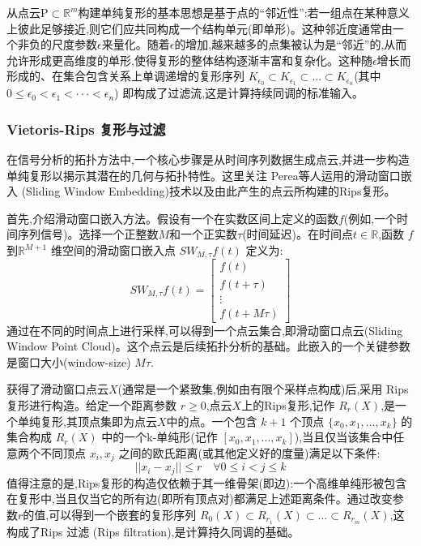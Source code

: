 从点云P$\subset \mathbb{R}^m$构建单纯复形的基本思想是基于点的“邻近性”:若一组点在某种意义上彼此足够接近,则它们应共同构成一个结构单元(即单形)。这种邻近度通常由一个非负的尺度参数$\epsilon$来量化。随着$\epsilon$的增加,越来越多的点集被认为是“邻近”的,从而允许形成更高维度的单形,使得复形的整体结构逐渐丰富和复杂化。这种随$\epsilon$增长而形成的、在集合包含关系上单调递增的复形序列 $K_{\epsilon_{0}}\subset K_{\epsilon_{1}}\subset...\subset K_{\epsilon_{n}}$(其中 $0\le\epsilon_{0}<\epsilon_{1}<\cdot\cdot\cdot<\epsilon_{n}$) 即构成了过滤流,这是计算持续同调的标准输入。

\subsubsection{Vietoris-Rips 复形与过滤} %
在信号分析的拓扑方法中,一个核心步骤是从时间序列数据生成点云,并进一步构造单纯复形以揭示其潜在的几何与拓扑特性。这里关注 Perea等人\cite{perea2015sliding}运用的滑动窗口嵌入 (Sliding Window Embedding)技术以及由此产生的点云所构建的Rips复形。

首先,介绍滑动窗口嵌入方法。假设有一个在实数区间上定义的函数$f$(例如,一个时间序列信号)。选择一个正整数$M$和一个正实数$\tau$(时间延迟)。在时间点$t \in \mathbb{R}$,函数 $f$到$\mathbb{R}^{M+1}$ 维空间的滑动窗口嵌入点 $SW_{M,\tau}f(t)$ 定义为:
\begin{equation}
    SW_{M,\tau}f(t)= \begin{bmatrix} f(t) \\ f(t+\tau) \\ \vdots \\ f(t+M\tau) \end{bmatrix}
\end{equation}
通过在不同的时间点上进行采样,可以得到一个点云集合,即滑动窗口点云(Sliding Window Point Cloud)。这个点云是后续拓扑分析的基础。此嵌入的一个关键参数是窗口大小(window-size) $M\tau$.

获得了滑动窗口点云$X$(通常是一个紧致集,例如由有限个采样点构成)后,采用 Rips 复形进行构造。给定一个距离参数 $r \ge 0$,点云$X$上的Rips复形,记作 $R_{r}(X)$,是一个单纯复形,其顶点集即为点云$X$中的点。一个包含 $k+1$ 个顶点 $\{x_{0},x_{1},...,x_{k}\}$ 的集合构成 $R_{r}(X)$ 中的一个k-单纯形(记作 $[x_{0},x_{1},...,x_{k}]$),当且仅当该集合中任意两个不同顶点 $x_i, x_j$ 之间的欧氏距离(或其他定义好的度量)满足以下条件:
\begin{equation}
    ||x_{i}-x_{j}||\le r \quad \forall 0\le i<j\le k
\end{equation}
值得注意的是,Rips复形的构造仅依赖于其一维骨架(即边):一个高维单纯形被包含在复形中,当且仅当它的所有边(即所有顶点对)都满足上述距离条件。通过改变参数$r$的值,可以得到一个嵌套的复形序列 $R_{0}(X)\subset R_{r_{1}}(X)\subset...\subset R_{r_{m}}(X)$,这构成了Rips 过滤 (Rips filtration),是计算持久同调的基础。

